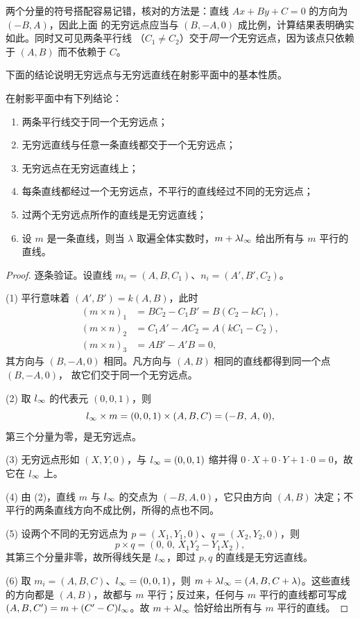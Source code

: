 \begin{remark}
两个分量的符号搭配容易记错，核对的方法是：直线 $Ax+By+C=0$ 的方向为 $(-B,A)$，因此上面
的无穷远点应当与 $(B,-A,0)$ 成比例，计算结果表明确实如此。同时又可见两条平行线
（$C_1\neq C_2$）交于\emph{同一个}无穷远点，因为该点只依赖于 $(A,B)$ 而不依赖于 $C$。
\end{remark}

下面的结论说明无穷远点与无穷远直线在射影平面中的基本性质。

\begin{proposition}
在射影平面中有下列结论：
\begin{enumerate}
\item 两条平行线交于同一个无穷远点；
\item 无穷远直线与任意一条直线都交于一个无穷远点；
\item 无穷远点在无穷远直线上；
\item 每条直线都经过一个无穷远点，不平行的直线经过不同的无穷远点；
\item 过两个无穷远点所作的直线是无穷远直线；
\item 设 $m$ 是一条直线，则当 $\lambda$ 取遍全体实数时，$m+\lambda l_{\infty}$ 给出所有与 $m$ 平行的直线。
\end{enumerate}
\end{proposition}

\begin{proof}
逐条验证。设直线 $m_i=(A,B,C_1)$、$n_i=(A',B',C_2)$。

(1) 平行意味着 $(A',B')=k(A,B)$，此时
\begin{align*}
(m\times n)_1&=B C_2-C_1B'=B(C_2-kC_1),\\
(m\times n)_2&=C_1A'-AC_2=A(kC_1-C_2),\\
(m\times n)_3&=AB'-A'B=0,
\end{align*}
其方向与 $(B,-A,0)$ 相同。凡方向与 $(A,B)$ 相同的直线都得到同一个点 $(B,-A,0)$，
故它们交于同一个无穷远点。

(2) 取 $l_{\infty}$ 的代表元 $(0,0,1)$，则
\[
l_{\infty}\times m=(0,0,1)\times(A,B,C)=(-B,\,A,\,0),
\]
第三个分量为零，是无穷远点。

(3) 无穷远点形如 $(X,Y,0)$，与 $l_{\infty}=(0,0,1)$ 缩并得 $0\cdot X+0\cdot Y+1\cdot 0=0$，故它在 $l_{\infty}$ 上。

(4) 由 (2)，直线 $m$ 与 $l_{\infty}$ 的交点为 $(-B,A,0)$，它只由方向 $(A,B)$ 决定；不平行的两条直线方向不成比例，所得的点也不同。

(5) 设两个不同的无穷远点为 $p=(X_1,Y_1,0)$、$q=(X_2,Y_2,0)$，则
\[
p\times q=(0,\,0,\,X_1Y_2-Y_1X_2),
\]
其第三个分量非零，故所得线矢是 $l_{\infty}$，即过 $p,q$ 的直线是无穷远直线。

(6) 取 $m_i=(A,B,C)$、$l_{\infty}=(0,0,1)$，则 $m+\lambda l_{\infty}=(A,B,C+\lambda)$。这些直线的方向都是 $(A,B)$，故都与 $m$ 平行；反过来，任何与 $m$ 平行的直线都可写成 $(A,B,C')=m+(C'-C)l_{\infty}$。故 $m+\lambda l_{\infty}$ 恰好给出所有与 $m$ 平行的直线。
\end{proof}

